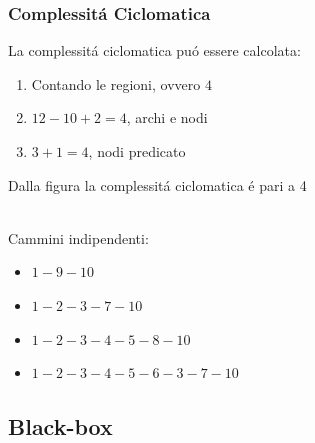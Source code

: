 \begin{frame}
    \frametitle{Complessitá Ciclomatica}
    La complessitá ciclomatica puó essere calcolata:
    \begin{enumerate}
        \item Contando le regioni, ovvero $4$
        \item $12-10+2=4$, archi e nodi
        \item $3+1=4$, nodi predicato
    \end{enumerate}
    Dalla figura la complessitá ciclomatica é pari a 4

    \\
    Cammini indipendenti:
    \begin{itemize}
        \item $1-9-10$
        \item $1-2-3-7-10$
        \item $1-2-3-4-5-8-10$
        \item $1-2-3-4-5-6-3-7-10$
    \end{itemize}
\end{frame}

\subsection{Black-box}
